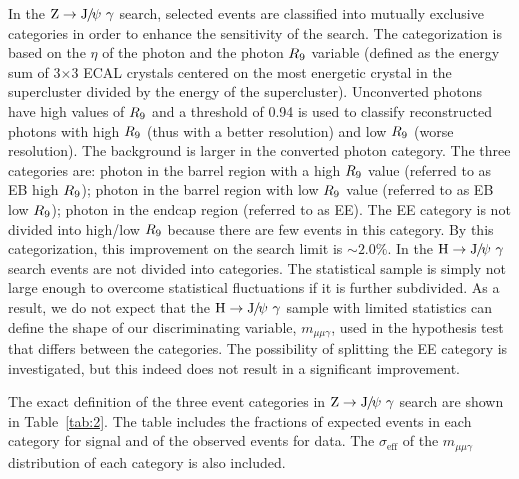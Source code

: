 	In the $\mathrm{Z}\to{\mathrm{J}\hspace{-.08em}/\hspace{-.14em}\psi}\ \gamma$ search, selected events are classified into mutually exclusive categories in order to enhance the sensitivity of the search. The categorization is based on the $\eta$ of the photon and the photon $R_\mathrm{9}$ variable (defined as the energy sum of 3$\times$3 ECAL crystals centered on the most energetic crystal in the supercluster divided by the energy of the supercluster). Unconverted photons have high values of $R_\mathrm{9}$ and a threshold of 0.94 is used to classify reconstructed photons with high $R_\mathrm{9}$ (thus with a better resolution) and low $R_\mathrm{9}$ (worse resolution).  The background is larger in the converted photon category.  The three categories are: photon in the barrel region with a high $R_\mathrm{9}$ value (referred to as EB high $R_\mathrm{9}$); photon in the barrel region with low $R_\mathrm{9}$ value (referred to as EB low $R_\mathrm{9}$); photon in the endcap region (referred to as EE). The EE category is not divided into high/low $R_\mathrm{9}$ because there are few events in this category. By this categorization, this improvement on the search limit is $\sim 2.0\%$.
	In the $\mathrm{H}\to{\mathrm{J}\hspace{-.08em}/\hspace{-.14em}\psi}\ \gamma$ search events are not divided into categories. The statistical sample is simply not large enough to overcome statistical fluctuations if it is further subdivided. As a result, we do not expect that the $\mathrm{H}\to{\mathrm{J}\hspace{-.08em}/\hspace{-.14em}\psi}\ \gamma$ sample with limited statistics can define the shape of our discriminating variable, $m_{\mu\mu\gamma}$, used in the hypothesis test that differs between the categories.	The possibility of splitting the EE category is investigated, but this indeed does not result in a significant improvement.	
		
		The exact definition of the three event categories in $\mathrm{Z}\to{\mathrm{J}\hspace{-.08em}/\hspace{-.14em}\psi}\ \gamma$ search are shown in Table~\ref{tab:2}.
		The table includes the fractions of expected events in each category for signal and of the observed events for data. The $\sigma_{\text{eff}}$ of the $m_{\mu\mu\gamma}$ distribution of each category is also included. 
		
